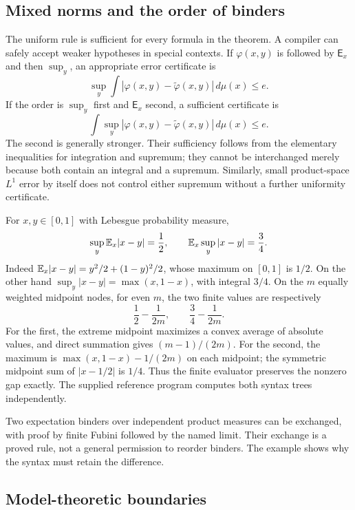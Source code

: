 \subsection{Mixed norms and the order of binders}

The uniform rule is sufficient for every formula in the theorem. A
compiler can safely accept weaker hypotheses in special contexts.
If $\varphi(x,y)$ is followed by $\mathsf E_x$ and then $\sup_y$, an
appropriate error certificate is
\[
 \sup_y\int |\varphi(x,y)-\widetilde\varphi(x,y)|\,d\mu(x)\le e.
\]
If the order is $\sup_y$ first and $\mathsf E_x$ second, a sufficient
certificate is
\[
 \int\sup_y|\varphi(x,y)-\widetilde\varphi(x,y)|\,d\mu(x)\le e.
\]
The second is generally stronger. Their sufficiency follows from the
elementary inequalities for integration and supremum; they cannot be
interchanged merely because both contain an integral and a supremum.
Similarly, small product-space $L^1$ error by itself does not control
either supremum without a further uniformity certificate.

\begin{example}\label{ex:binder-order}
For $x,y\in[0,1]$ with Lebesgue probability measure,
\[
 \sup_y\mathbb E_x|x-y|=\frac12,
 \qquad
 \mathbb E_x\sup_y|x-y|=\frac34.
\]
Indeed $\mathbb E_x|x-y|=y^2/2+(1-y)^2/2$, whose maximum on $[0,1]$ is
$1/2$. On the other hand $\sup_y|x-y|=\max(x,1-x)$, with integral
$3/4$. On the $m$ equally weighted midpoint nodes, for even $m$, the
two finite values are respectively
\[
 \frac12-\frac1{2m},\qquad\frac34-\frac1{2m}.
\]
For the first, the extreme midpoint maximizes a convex average of
absolute values, and direct summation gives $(m-1)/(2m)$. For the second,
the maximum is $\max(x,1-x)-1/(2m)$ on each midpoint; the symmetric
midpoint sum of $|x-1/2|$ is $1/4$. Thus the finite evaluator preserves
the nonzero gap exactly. The supplied reference program computes both
syntax trees independently.
\end{example}

Two expectation binders over independent product measures can be
exchanged, with proof by finite Fubini followed by the named limit.
Their exchange is a proved rule, not a general permission to reorder
binders. The example shows why the syntax must retain the difference.

\subsection{Model-theoretic boundaries}

